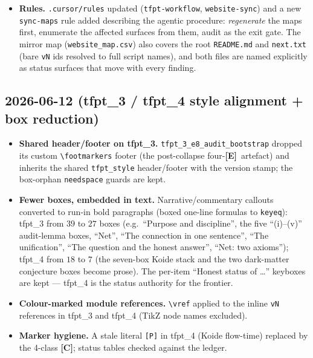 \documentclass[11pt]{article}
\providecommand{\mE}{\textbf{[E]}}\providecommand{\mC}{\textbf{[C]}}
\providecommand{\vref}[1]{\texttt{#1}}
\begin{document}
\begin{itemize}
  \texttt{tfpt\_2} sections (hexagonal resolvent; master cover), and two short
  \texttt{\textbackslash veri\{v19\}} citations were expanded to the full script name.
  \vref{v91} (spine tetrahedron) had no paper section at all --- it is now integrated:
  a keybox in \texttt{tfpt\_3} (``Three views of one spine'': anchor closure, edge/face
  products, volume $120$, $K_6$ negative control, the tautology/sub-grammar caveats) and
  a closing note in the \texttt{tfpt\_1} Spine Quotient Lemma; the
  \texttt{ARCH.SPINE.01} ledger location is corrected to \texttt{tfpt\_1;tfpt\_3} and the
  baseline exception list is empty again.
\item \textbf{Rules.} \texttt{.cursor/rules} updated (\texttt{tfpt-workflow},
  \texttt{website-sync}) and a new \texttt{sync-maps} rule added describing the agentic
  procedure: \emph{regenerate} the maps first, enumerate the affected surfaces from
  them, audit as the exit gate. The mirror map (\texttt{website\_map.csv}) also covers
  the root \texttt{README.md} and \texttt{next.txt} (bare \texttt{vN} ids resolved to
  full script names), and both files are named explicitly as status surfaces that move
  with every finding.
\end{itemize}

\subsection*{2026-06-12 (tfpt\_3 / tfpt\_4 style alignment + box reduction)}
\begin{itemize}
\item \textbf{Shared header/footer on tfpt\_3.} \texttt{tfpt\_3\_e8\_audit\_bootstrap} dropped its custom
  \texttt{\textbackslash footmarkers} footer (the post-collapse four-\mE\ artefact) and inherits the
  shared \texttt{tfpt\_style} header/footer with the version stamp; the box-orphan \texttt{needspace}
  guards are kept.
\item \textbf{Fewer boxes, embedded in text.} Narrative/commentary callouts converted to run-in bold
  paragraphs (boxed one-line formulas to \texttt{keyeq}): tfpt\_3 from $39$ to $27$ boxes (e.g.\
  ``Purpose and discipline'', the five ``(i)--(v)'' audit-lemma boxes, ``Net'', ``The connection in one
  sentence'', ``The unification'', ``The question and the honest answer'', ``Net: two axioms''); tfpt\_4
  from $18$ to $7$ (the seven-box Koide stack and the two dark-matter conjecture boxes become prose). The
  per-item ``Honest status of \ldots'' keyboxes are kept --- tfpt\_4 is the status authority for the
  frontier.
\item \textbf{Colour-marked module references.} \texttt{\textbackslash vref} applied to the inline
  \texttt{vN} references in tfpt\_3 and tfpt\_4 (TikZ node names excluded).
\item \textbf{Marker hygiene.} A stale literal \texttt{[P]} in tfpt\_4 (Koide flow-time) replaced by the
  4-class \mC; status tables checked against the ledger.
\end{itemize}
\end{document}
